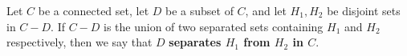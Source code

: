 Let $C$ be a connected set, let $D$ be a subset of $C$, and let $H_1, H_2$ be disjoint sets in $C - D$. If $C - D$ is the union of two separated sets containing $H_1$ and $H_2$ respectively, then we say that $D$ \textbf{separates $H_1$ from $H_2$ in $C$}.
